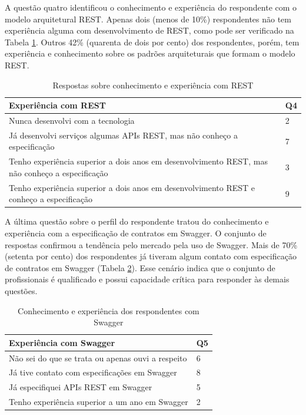 A questão quatro identificou o conhecimento e experiência do respondente com o
modelo arquitetural REST. Apenas dois (menos de 10\%) respondentes não tem
experiência alguma com desenvolvimento de \wss{} REST, como pode ser verificado na Tabela
\ref{quantidadeRespostas4}. Outros 42\% (quarenta de dois por cento) dos
respondentes, porém, tem experiência e conhecimento sobre os padrões arquiteturais que formam
o modelo REST.

\begin{table}[!bth] 
\centering
\vspace{0.5cm}
\scriptsize
\begin{tabular}{p{10cm}|p{1cm}}
\hline   
Experiência com REST & Q4 \\
\hline   
Nunca desenvolvi com a tecnologia &  2  \\
Já desenvolvi serviços algumas APIs REST, mas não conheço a especificação & 7 \\
Tenho experiência superior a dois anos em desenvolvimento REST, mas não conheço
a especificação & 3 \\
Tenho experiência superior a dois anos em desenvolvimento REST e conheço a
especificação &  9  \\

\end{tabular}
\caption{Respostas sobre conhecimento e experiência com REST}
\label{quantidadeRespostas4}
\end{table}

A última questão sobre o perfil do respondente tratou do conhecimento e
experiência com a especificação de contratos em Swagger. O conjunto de respostas
confirmou a tendência pelo mercado pela uso de Swagger. Mais de 70\% (setenta
por cento) dos respondentes já tiveram algum contato com especificação de
contratos em Swagger (Tabela \ref{quantidadeRespostas5}). Esse cenário indica
que o conjunto de profissionais é qualificado e possui capacidade crítica para
responder às demais questões.

\begin{table}[!bth] 
\centering
\vspace{0.5cm}
\scriptsize
\begin{tabular}{p{10cm}|p{1cm}}
\hline   
Experiência com Swagger & Q5 \\
\hline   
Não sei do que se trata ou apenas ouvi a respeito & 6 \\
Já tive contato com especificações em Swagger & 8 \\ 
Já especifiquei APIs REST em Swagger &  5  \\
Tenho experiência superior a um ano em Swagger & 2 \\


\end{tabular}
\caption{Conhecimento e experiência dos respondentes com Swagger}
\label{quantidadeRespostas5}
\end{table}

